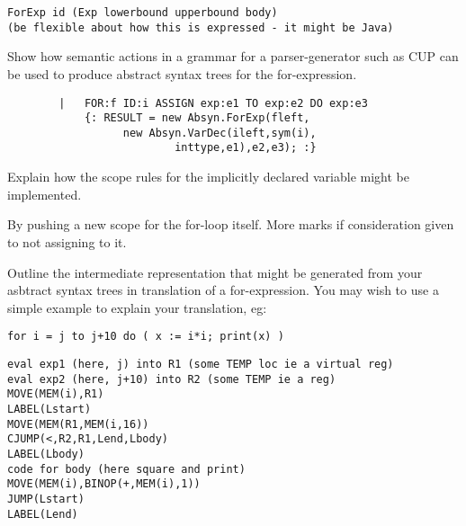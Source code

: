 \documentclass[11pt]{cityexam}
\begin{document}
\begin{questions}
\begin{subquestions}
\begin{modelanswer}
\begin{verbatim}
ForExp id (Exp lowerbound upperbound body) 
(be flexible about how this is expressed - it might be Java)
\end{verbatim}
\end{modelanswer}

\subquestion
Show how semantic actions in a grammar for a parser-generator such as CUP
can be used to produce abstract syntax trees for the for-expression.

\begin{modelanswer}
\begin{verbatim}
        |   FOR:f ID:i ASSIGN exp:e1 TO exp:e2 DO exp:e3
            {: RESULT = new Absyn.ForExp(fleft, 
                  new Absyn.VarDec(ileft,sym(i),
                          inttype,e1),e2,e3); :}
\end{verbatim}
\end{modelanswer}

\subquestion
Explain how the scope rules for the implicitly declared variable might
be implemented.

\begin{modelanswer}
By pushing a new scope for the for-loop itself. More marks if consideration
given to not assigning to it.
\end{modelanswer}

\subquestion
        Outline the intermediate representation
        that might be generated from your
	asbtract syntax trees in translation of
        a for-expression.
	You may wish to use a simple example to explain your 
	translation, eg:
\begin{verbatim}
for i = j to j+10 do ( x := i*i; print(x) )
\end{verbatim}

\begin{modelanswer}
\begin{verbatim}
eval exp1 (here, j) into R1 (some TEMP loc ie a virtual reg)
eval exp2 (here, j+10) into R2 (some TEMP ie a reg)
MOVE(MEM(i),R1)
LABEL(Lstart)
MOVE(MEM(R1,MEM(i,16))
CJUMP(<,R2,R1,Lend,Lbody)
LABEL(Lbody)
code for body (here square and print)
MOVE(MEM(i),BINOP(+,MEM(i),1))
JUMP(Lstart)
LABEL(Lend)
\end{verbatim}
\end{modelanswer}

\end{subquestions}

\question



\end{questions}
\end{document}
